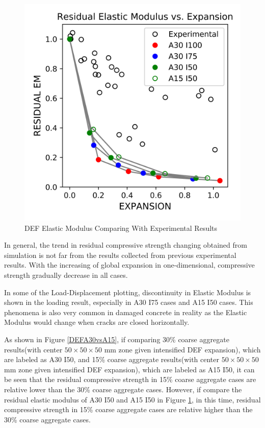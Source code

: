 \begin{figure}[ht!]
\centering
\includegraphics[width=.8\linewidth]{Files/CS_plot/DEFEM_all.png}
  \caption{DEF Elastic Modulus Comparing With Experimental Results}
  \label{DEF_EM_summary}
\end{figure}


In general, the trend in residual compressive strength changing obtained from simulation is not far from the results collected from previous experimental results. With the increasing of global expansion in one-dimensional, compressive strength gradually decrease in all cases.

In some of the Load-Displacement plotting, discontinuity in Elastic Modulus is shown in the loading result, especially in A30 I75 cases and A15 I50 cases. This phenomena is also very common in damaged concrete in reality as the Elastic Modulus would change when cracks are closed horizontally.

As shown in Figure \ref{DEFA30vsA15}, if comparing 30\% coarse aggregate results(with center $50 \times 50 \times 50$ mm zone given intensified DEF expansion), which are labeled as A30 I50, and 15\% coarse aggregate results(with center $50 \times 50 \times 50$ mm zone given intensified DEF expansion), which are labeled as A15 I50, it can be seen that the residual compressive strength in 15\% coarse aggregate cases are relative lower than the 30\% coarse aggregate cases. However, if compare the residual elastic modulus of A30 I50 and A15 I50 in Figure \ref{DEF_EM_summary}, in this time, residual compressive strength in 15\% coarse aggregate cases are relative higher than the 30\% coarse aggregate cases.

